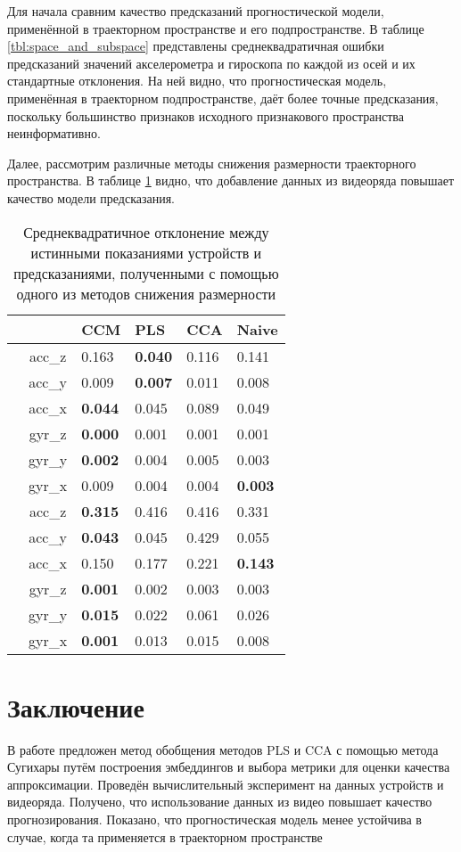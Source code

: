 \documentclass[a4paper, 12pt]{article}
\begin{document}
Для начала сравним качество предсказаний прогностической модели, применённой в траекторном пространстве и его подпространстве.
В таблице \ref{tbl:space_and_subspace} представлены среднеквадратичная ошибки предсказаний значений акселерометра и гироскопа по каждой из осей и их стандартные отклонения. 
На ней видно, что прогностическая модель, применённая в траекторном подпространстве, даёт более точные предсказания, поскольку большинство признаков исходного признакового пространства неинформативно.

Далее, рассмотрим различные методы снижения размерности траекторного пространства. В таблице \ref{tbl:methods} видно, что добавление данных из видеоряда повышает качество модели предсказания.

\begin{table}[bhtp]
	\centering
	\caption{Среднеквадратичное отклонение между истинными показаниями устройств и предсказаниями, полученными с помощью одного из методов снижения размерности}
	\label{tbl:methods}
	\begin{tabular}{l|c|llll}
		\hline
		\multicolumn{2}{l}{\diaghead{\hskip4cm}{Целевой признак}{Метод}} \vline & CCM & PLS & CCA & Naive \\
		\hline
		\multirow{6}{*}{\rotatebox[origin=c]{90}{cyclic}} & acc\_z & 0.163 & \textbf{0.040} & 0.116 & 0.141 \\
		& acc\_y & 0.009 & \textbf{0.007} & 0.011 & 0.008 \\
		& acc\_x & \textbf{0.044} & 0.045 & 0.089 & 0.049 \\
		& gyr\_z & \textbf{0.000} & 0.001 & 0.001 & 0.001 \\
		& gyr\_y & \textbf{0.002} & 0.004 & 0.005 & 0.003 \\
		& gyr\_x & 0.009 & 0.004 & 0.004 & \textbf{0.003} \\
		\hline
		\multirow{6}{*}{\rotatebox[origin=c]{90}{chaotic}} & acc\_z & \textbf{0.315} & 0.416 & 0.416 & 0.331 \\
		& acc\_y & \textbf{0.043} & 0.045 & 0.429 & 0.055 \\
		& acc\_x & 0.150 & 0.177 & 0.221 & \textbf{0.143} \\
		& gyr\_z & \textbf{0.001} & 0.002 & 0.003 & 0.003 \\
		& gyr\_y & \textbf{0.015} & 0.022 & 0.061 & 0.026 \\
		& gyr\_x & \textbf{0.001} & 0.013 & 0.015 & 0.008 \\
		\hline   
	\end{tabular}
\end{table}

\section{Заключение}
В работе предложен метод обобщения методов PLS и CCA с помощью метода Сугихары путём построения эмбеддингов и выбора метрики для оценки качества аппроксимации.  
Проведён вычислительный эксперимент на данных устройств и видеоряда. 
Получено, что использование данных из видео повышает качество прогнозирования. 
Показано, что прогностическая модель менее устойчива в случае, когда та применяется в траекторном пространстве



\end{document}
